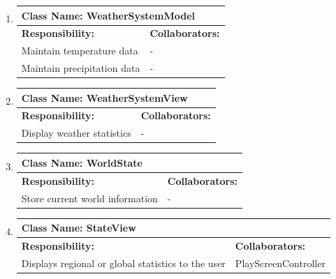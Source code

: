 \documentclass[]{article}
\begin{document}
\begin{enumerate}[1.]
	\item
	\begin{tabular}{|p{10cm}|p{4cm}|}
	    \hline
	     \multicolumn{2}{|l|}{\textbf{Class Name:  WeatherSystemModel}} \\
	    \hline
	    \textbf{Responsibility:} & \textbf{Collaborators:} \\
	    \hline
	    Maintain temperature data & - \\
			Maintain precipitation data & - \\

	    \hline
	  \end{tabular}

	\item
	\begin{tabular}{|p{10cm}|p{4cm}|}
	    \hline
	     \multicolumn{2}{|l|}{\textbf{Class Name:  WeatherSystemView}} \\
	    \hline
	    \textbf{Responsibility:} & \textbf{Collaborators:} \\
	    \hline
			Display weather statistics & - \\

	    \hline
	  \end{tabular}

	\item
	\begin{tabular}{|p{10cm}|p{4cm}|}
	    \hline
	     \multicolumn{2}{|l|}{\textbf{Class Name:  WorldState}} \\
	    \hline
	    \textbf{Responsibility:} & \textbf{Collaborators:} \\
	    \hline
	    Store current world information & - \\
	
	    \hline
	  \end{tabular}

	\item
	\begin{tabular}{|p{10cm}|p{4cm}|}
	    \hline
	     \multicolumn{2}{|l|}{\textbf{Class Name:  StateView}} \\
	    \hline
	    \textbf{Responsibility:} & \textbf{Collaborators:} \\
	    \hline
			Displays regional or global statistics to the user & PlayScreenController \\

	    \hline
	  \end{tabular}


\end{enumerate}
\end{document}
